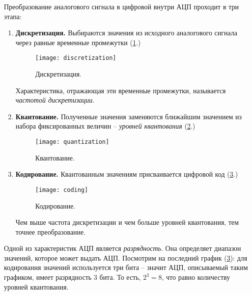 \documentclass[../sparc.tex]{subfiles}
\begin{document}

Преобразование аналогового сигнала в цифровой внутри АЦП проходит в три этапа:
\begin{enumerate}

\item \textbf{Дискретизация.} Выбираются значения из исходного аналогового сигнала через
  равные временные промежутки (\ref{fig:discretization}.)

  \begin{figure}[h]
    \centering
    \texttt{[image: discretization]}
    \caption{Дискретизация.}
    \label{fig:discretization}
  \end{figure}

  Характеристика, отражающая эти временные промежутки, называется \emph{частотой
  дискретизации}.

\item \textbf{Квантование.} Полученные значения заменяются ближайшим значением из
  набора фиксированных величин -- \emph{уровней квантования}
  (\ref{fig:quantization}.)

  \begin{figure}[h]
    \texttt{[image: quantization]}
    \caption{Квантование.}
    \label{fig:quantization}
    \centering
  \end{figure}

\item \textbf{Кодирование.} Квантованным значениям присваивается цифровой код
  (\ref{fig:coding}.)

  \begin{figure}[h]
    \texttt{[image: coding]}
    \caption{Кодирование.}
    \label{fig:coding}
    \centering
  \end{figure}

  Чем выше частота дискретизации и чем больше уровней квантования, тем точнее
  преобразование.

\end{enumerate}

Одной из характеристик АЦП является \emph{разрядность}. Она определяет диапазон
значений, которое может выдать АЦП. Посмотрим на последний график
(\ref{fig:coding}): для кодирования значений используется три бита -- значит
АЦП, описываемый таким графиком, имеет разрядность 3 бита.  То есть, $ 2^3 = 8
$, что равно количеству уровней квантования.
\end{document}
